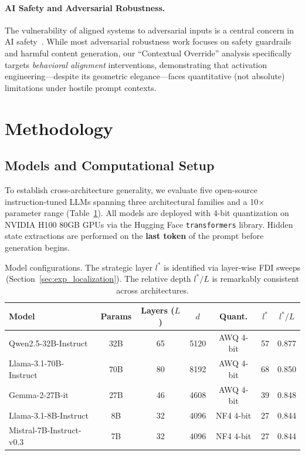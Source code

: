 \documentclass{article}
\begin{document}
\paragraph{AI Safety and Adversarial Robustness.}
The vulnerability of aligned systems to adversarial inputs is a central concern in AI safety~\citep{perez2022red, wei2024jailbroken}. While most adversarial robustness work focuses on safety guardrails and harmful content generation, our ``Contextual Override'' analysis specifically targets \textit{behavioral alignment} interventions, demonstrating that activation engineering---despite its geometric elegance---faces quantitative (not absolute) limitations under hostile prompt contexts.


\section{Methodology}
\label{sec:method}

\subsection{Models and Computational Setup}

To establish cross-architecture generality, we evaluate five open-source instruction-tuned LLMs spanning three architectural families and a 10$\times$ parameter range (Table~\ref{tab:models}). All models are deployed with 4-bit quantization on NVIDIA H100 80GB GPUs via the Hugging Face \texttt{transformers} library. Hidden state extractions are performed on the \textbf{last token} of the prompt before generation begins.

\begin{table}[h]
\centering
\caption{Model configurations. The strategic layer $l^*$ is identified via layer-wise FDI sweeps (Section~\ref{sec:exp_localization}). The relative depth $l^*/L$ is remarkably consistent across architectures.}
\label{tab:models}
\small
\begin{tabular}{lcccccc}
\toprule
\textbf{Model} & \textbf{Params} & \textbf{Layers ($L$)} & \textbf{$d$} & \textbf{Quant.} & \textbf{$l^*$} & \textbf{$l^*/L$} \\
\midrule
Qwen2.5-32B-Instruct  & 32B & 65 & 5120 & AWQ 4-bit & 57 & 0.877 \\
Llama-3.1-70B-Instruct & 70B & 80 & 8192 & AWQ 4-bit & 68 & 0.850 \\
Gemma-2-27B-it         & 27B & 46 & 4608 & AWQ 4-bit & 39 & 0.848 \\
Llama-3.1-8B-Instruct  & 8B  & 32 & 4096 & NF4 4-bit & 27 & 0.844 \\
Mistral-7B-Instruct-v0.3 & 7B & 32 & 4096 & NF4 4-bit & 27 & 0.844 \\
\bottomrule
\end{tabular}
\end{table}
\end{document}
